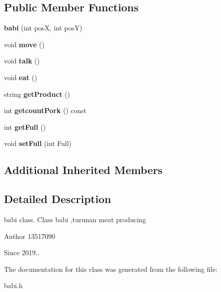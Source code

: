 \subsection*{Public Member Functions}
\begin{DoxyCompactItemize}
\item 
\mbox{\label{classbabi_a8a0eaad29a7457b8f0a8c21c658f9a05}} 
{\bfseries babi} (int posX, int posY)
\item 
\mbox{\label{classbabi_a7386a0dd69b53d3f42a6770bf86f67b6}} 
void {\bfseries move} ()
\item 
\mbox{\label{classbabi_a2c18230abf410234e222bca1effe4d40}} 
void {\bfseries talk} ()
\item 
\mbox{\label{classbabi_a516689c81dfeb1f0f167e5bc44bc9264}} 
void {\bfseries eat} ()
\item 
\mbox{\label{classbabi_aa106ff7acf31bf9f47e7f9f0f5692f4d}} 
string {\bfseries get\+Product} ()
\item 
\mbox{\label{classbabi_af3f2e9d1b45c036f751a0f1e7aa64c32}} 
int {\bfseries getcount\+Pork} () const
\item 
\mbox{\label{classbabi_a719415a9f2472843122d5f2c7e5920fa}} 
int {\bfseries get\+Full} ()
\item 
\mbox{\label{classbabi_abd5372713081247b04ea16042f81d940}} 
void {\bfseries set\+Full} (int Full)
\end{DoxyCompactItemize}
\subsection*{Additional Inherited Members}


\subsection{Detailed Description}
babi class. Class babi ,turunan meat producing \begin{DoxyAuthor}{Author}
13517090 
\end{DoxyAuthor}
\begin{DoxySince}{Since}
2019.. 
\end{DoxySince}


The documentation for this class was generated from the following file\+:\begin{DoxyCompactItemize}
\item 
babi.\+h\end{DoxyCompactItemize}
